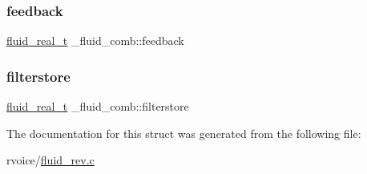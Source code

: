 \subsubsection{\texorpdfstring{feedback}{feedback}}
{\footnotesize\ttfamily \hyperlink{fluidsynth__priv_8h_a9e96f0917747b69cabb7c671bc693dbb}{fluid\+\_\+real\+\_\+t} \+\_\+fluid\+\_\+comb\+::feedback}

\mbox{\label{struct__fluid__comb_a52d450869a07862b168617759e025819}} 
\subsubsection{\texorpdfstring{filterstore}{filterstore}}
{\footnotesize\ttfamily \hyperlink{fluidsynth__priv_8h_a9e96f0917747b69cabb7c671bc693dbb}{fluid\+\_\+real\+\_\+t} \+\_\+fluid\+\_\+comb\+::filterstore}



The documentation for this struct was generated from the following file\+:\begin{DoxyCompactItemize}
\item 
rvoice/\hyperlink{fluid__rev_8c}{fluid\+\_\+rev.\+c}\end{DoxyCompactItemize}
